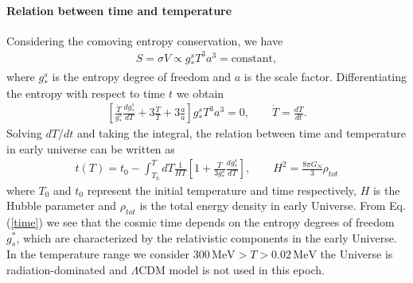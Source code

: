 \paragraph{Relation between time and temperature}
Considering the comoving entropy conservation, we have
\begin{align}
S=\sigma V\propto g^s_\ast T^3a^3=\mathrm{constant},
\end{align}
where $g^s_\ast$ is the entropy degree of freedom and $a$ is the scale factor. Differentiating the entropy with respect to time $t$ we obtain
\begin{align}
\left[\frac{\dot{T}}{g^s_\ast}\frac{dg^s_\ast}{dT}+3\frac{\dot{T}}{T}+3\frac{\dot{a}}{a}\right]g^s_\ast T^3a^3=0,\qquad \dot{T}=\frac{dT}{dt}.
\end{align}
Solving $dT/dt$ and taking the integral, the relation between time and temperature in early universe can be written as
\begin{align}\label{time}
t(T)=t_0-\int^T_{T_0}dT\frac{1}{HT}\left[1+\frac{T}{3g^s_\ast}\frac{dg^s_\ast}{dT}\right],\qquad H^2=\frac{8\pi G_N}{3}\rho_{tot}
\end{align}
where $T_0$ and $t_0$ represent the initial temperature and time respectively, $H$ is the Hubble parameter and $\rho_{tot}$ is the total energy density in early Universe. From Eq. (\ref{time}) we see that the cosmic time depends on the entropy degrees of freedom $g^\ast_s$, which are characterized by the relativistic components in the early Universe. In the temperature range we consider $300\,\mathrm{MeV}>T>0.02\,\mathrm{MeV}$ the Universe is radiation-dominated and $\Lambda$CDM model is not used in this epoch.


